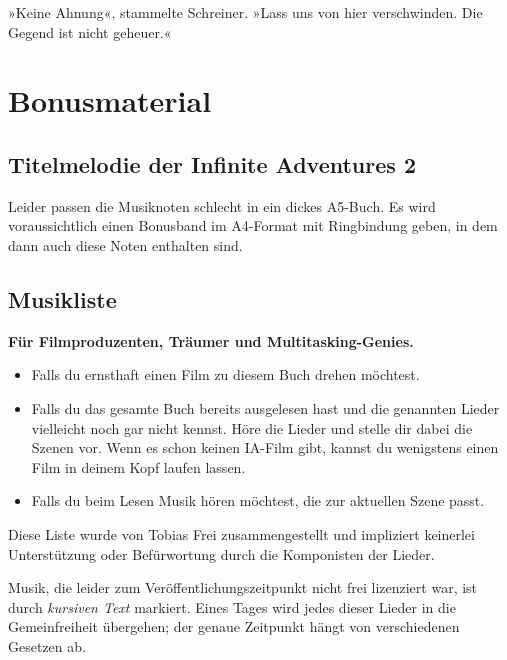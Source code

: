 »Keine Ahnung«, stammelte Schreiner. »Lass uns von hier verschwinden. Die Gegend ist nicht geheuer.«


\part{Bonusmaterial}

\chapter{Titelmelodie der Infinite Adventures 2}

Leider passen die Musiknoten schlecht in ein dickes A5-Buch. Es wird voraussichtlich einen Bonusband im A4-Format mit Ringbindung geben, in dem dann auch diese Noten enthalten sind.

%


\chapter{Musikliste}

\textbf{Für Filmproduzenten, Träumer und Multitasking-Genies.}

\begin{itemize}
    \item Falls du ernsthaft einen Film zu diesem Buch drehen möchtest.
    \item Falls du das gesamte Buch bereits ausgelesen hast und die genannten Lieder vielleicht noch gar nicht kennst. Höre die Lieder und stelle dir dabei die Szenen vor. Wenn es schon keinen IA-Film gibt, kannst du wenigstens einen Film in deinem Kopf laufen lassen.
    \item Falls du beim Lesen Musik hören möchtest, die zur aktuellen Szene passt.
\end{itemize}

Diese Liste wurde von Tobias Frei zusammengestellt und impliziert keinerlei Unterstützung oder Befürwortung durch die Komponisten der Lieder.

Musik, die leider zum Veröffentlichungszeitpunkt nicht frei lizenziert war, ist durch \textit{kursiven Text} markiert. Eines Tages wird jedes dieser Lieder in die Gemeinfreiheit übergehen; der genaue Zeitpunkt hängt von verschiedenen Gesetzen ab.

